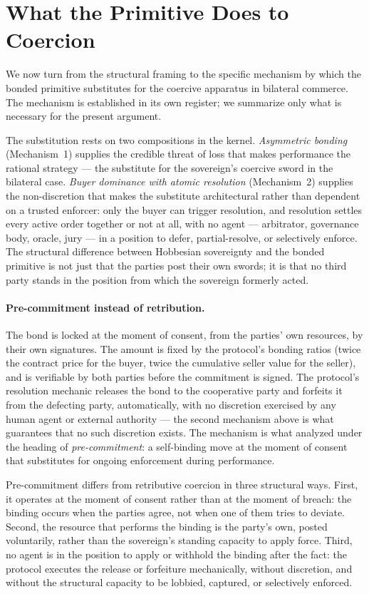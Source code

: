 \documentclass[11pt,a4paper]{article}
\theoremstyle{remark}
\begin{document}
\section{What the Primitive Does to Coercion}
\label{sec:what-primitive-does}

We now turn from the structural framing to the specific mechanism
by which the bonded primitive substitutes for the coercive
apparatus in bilateral commerce. The mechanism is established in
its own register; we summarize only what is necessary for the
present argument.

The substitution rests on two compositions in the kernel.
\emph{Asymmetric bonding} (Mechanism~1) supplies the credible
threat of loss that makes performance the rational strategy ---
the substitute for the sovereign's coercive sword in the bilateral
case. \emph{Buyer dominance with atomic resolution} (Mechanism~2)
supplies the non-discretion that makes the substitute architectural
rather than dependent on a trusted enforcer: only the buyer can
trigger resolution, and resolution settles every active order
together or not at all, with no agent --- arbitrator, governance
body, oracle, jury --- in a position to defer, partial-resolve, or
selectively enforce. The structural difference between Hobbesian
sovereignty and the bonded primitive is not just that the parties
post their own swords; it is that no third party stands in the
position from which the sovereign formerly acted.

\paragraph{Pre-commitment instead of retribution.}
The bond is locked at the moment of consent, from the parties'
own resources, by their own signatures. The amount is fixed by
the protocol's bonding ratios (twice the contract price for the
buyer, twice the cumulative seller value for the seller), and is
verifiable by both parties before the commitment is signed. The
protocol's resolution mechanic releases the bond to the
cooperative party and forfeits it from the defecting party,
automatically, with no discretion exercised by any human agent
or external authority --- the second mechanism above is what
guarantees that no such discretion exists. The mechanism is what
\citet{elster1979ulysses} analyzed under the heading of
\emph{pre-commitment}: a self-binding move at the moment of
consent that substitutes for ongoing enforcement during
performance.

Pre-commitment differs from retributive coercion in three
structural ways. First, it operates at the moment of consent
rather than at the moment of breach: the binding occurs when the
parties agree, not when one of them tries to deviate. Second,
the resource that performs the binding is the party's own,
posted voluntarily, rather than the sovereign's standing
capacity to apply force. Third, no agent is in the position to
apply or withhold the binding after the fact: the protocol
executes the release or forfeiture mechanically, without
discretion, and without the structural capacity to be lobbied,
captured, or selectively enforced.
\end{document}
